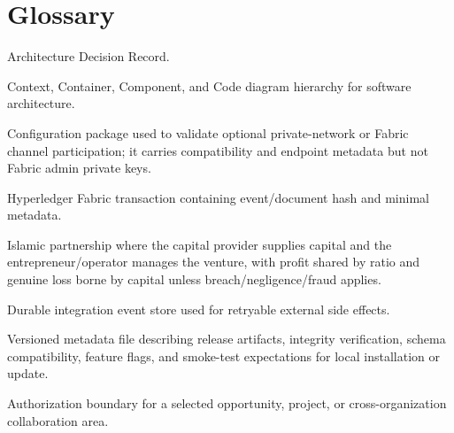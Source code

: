 \documentclass[11pt,a4paper]{article}
\begin{document}
\section{Glossary}
\begin{description}[leftmargin=40mm,style=nextline]
\item[ADR] Architecture Decision Record.
\item[C4] Context, Container, Component, and Code diagram hierarchy for software architecture.
\item[Channel join package] Configuration package used to validate optional private-network or Fabric channel participation; it carries compatibility and endpoint metadata but not Fabric admin private keys.
\item[Fabric anchor] Hyperledger Fabric transaction containing event/document hash and minimal metadata.
\item[Mudarabah] Islamic partnership where the capital provider supplies capital and the entrepreneur/operator manages the venture, with profit shared by ratio and genuine loss borne by capital unless breach/negligence/fraud applies.
\item[Outbox] Durable integration event store used for retryable external side effects.
\item[Release manifest] Versioned metadata file describing release artifacts, integrity verification, schema compatibility, feature flags, and smoke-test expectations for local installation or update.
\item[Workspace scope] Authorization boundary for a selected opportunity, project, or cross-organization collaboration area.
\end{description}
\end{document}
